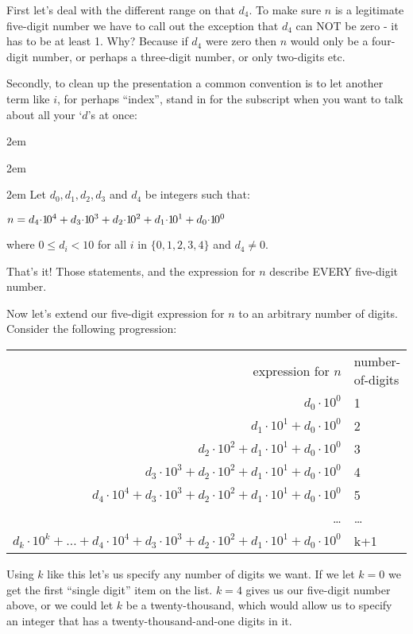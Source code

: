 \documentclass{article}
\newenvironment{jprIn}{\begin{adjustwidth}{2em}{}}{\end{adjustwidth}}
\begin{document}
First let's deal with the different range on that $d_4$. To make sure $n$ is a legitimate five-digit number we have to
call out the exception that $d_4$ can NOT be zero - it has to be at least 1.
Why? Because if $d_4$ were zero then $n$ would only be a
four-digit number, or perhaps a three-digit number, or only two-digits etc.

Secondly, to clean up the presentation
a common convention
is to let another term like $i$, for perhaps ``index'', stand in for the subscript
when you want to talk about all your `$d$'s at once:
\begin{jprIn}
\begin{jprIn}
\begin{jprIn}
Let $d_0, d_1, d_2,d_3$ and $d_4$ be integers such that:

\hspace{3em}$n
=d_4{\cdot}{1\hspace{-0.12em}0}^4
+d_3{\cdot}{1\hspace{-0.12em}0}^3
+d_2{\cdot}{1\hspace{-0.12em}0}^2
+d_1{\cdot}{1\hspace{-0.12em}0}^1
+d_0{\cdot}{1\hspace{-0.12em}0}^0$

where $0\le{}d_i<10$ for all $i$ in $\{0,1,2,3,4\}$ and $d_4\ne0$.
\end{jprIn}
\end{jprIn}
\end{jprIn}
That's it! Those statements, and the expression for $n$ describe EVERY five-digit number.

Now let's extend
our five-digit expression for $n$ to an arbitrary
number of digits.
Consider the following progression:
\begin{center}
\begin{tabular}{r l}
expression for $n$ & number-of-digits\\
$d_0{\cdot}10^0$ & 1\\
$d_1{\cdot}10^1+d_0{\cdot}10^0$ & 2\\
$d_2{\cdot}10^2+d_1{\cdot}10^1+d_0{\cdot}10^0$ & 3\\
$d_3{\cdot}10^3+d_2{\cdot}10^2+d_1{\cdot}10^1+d_0{\cdot}10^0$ & 4\\
$d_4{\cdot}10^4+d_3{\cdot}10^3+d_2{\cdot}10^2+d_1{\cdot}10^1+d_0{\cdot}10^0$ & 5\\
\dots{} & \dots{}\\
$d_k{\cdot}10^k+\dots{}+d_4{\cdot}10^4+d_3{\cdot}10^3+d_2{\cdot}10^2+d_1{\cdot}10^1+d_0{\cdot}10^0$ & k+1
\end{tabular}
\end{center}
Using $k$ like this let's us specify any number of digits we want.
If we let $k=0$ we get the first ``single digit'' 
item on the list.  $k=4$ gives us our five-digit number above,
or we could let $k$ be a twenty-thousand, which would allow
us to specify an integer that has a twenty-thousand-and-one
digits in it.
\end{document}
